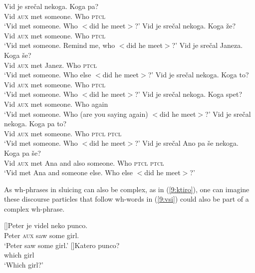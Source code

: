 \documentclass[output=paper,
modfonts,
newtxmath,
hidelinks
]{langscibook}
\begin{document}
\begin{exe}
\ex\label{9:vsi}
\begin{xlist}
 \ex 
 \gll Vid je srečal nekoga. Koga pa? \\
 Vid \textsc{aux} met someone. Who \textsc{ptcl} \\
 \trans `Vid met someone. Who $<$did he meet$>$?'
 \ex	
 \gll Vid je srečal nekoga. Koga že?\\
	 Vid \textsc{aux} met someone. Who \textsc{ptcl} \\
 \trans	`Vid met someone. Remind me, who $<$did he meet$>$?'
  \ex	
 \gll 	Vid je srečal Janeza. Koga še?\\
		Vid \textsc{aux} met Janez. Who \textsc{ptcl} \\
 \trans	`Vid met someone. Who else $<$did he meet$>$?'
 \ex	
 \gll 	Vid je srečal nekoga. Koga to?\\
		Vid \textsc{aux} met someone. Who \textsc{ptcl} \\
 \trans	`Vid met someone. Who $<$did he meet$>$?'
 \ex	
 \gll 	Vid je srečal nekoga. Koga spet?\\
		Vid \textsc{aux} met someone. Who again\\
 \trans	`Vid met someone. Who (are you saying again) $<$did he meet$>$?'
 \ex	
 \gll Vid je srečal nekoga. Koga pa to?\\
		Vid \textsc{aux} met someone. Who  \textsc{ptcl}  \textsc{ptcl}  \\
 \trans	`Vid met someone. Who $<$did he meet$>$?'
 \ex 
 \gll	Vid je srečal Ano pa še nekoga.  Koga pa še?\\
		Vid \textsc{aux} met Ana and also someone. Who \textsc{ptcl}  \textsc{ptcl} \\
 \trans	 `Vid met Ana and someone else. Who else $<$did he meet$>$?'
 \end{xlist}
\end{exe}

\noindent As wh-phrases in sluicing can also be complex, as in (\ref{9:ktiro}), one can imagine these discourse particles that follow wh-words in (\ref{9:vsi}) could also be part of a complex wh-phrase. 

\begin{exe}
 \ex\label{9:ktiro}
 \begin{xlist}
 []{\gll Peter je videl neko punco.\\
	Peter \textsc{aux} saw some girl.\\
    \trans `Peter saw some girl.'}
  []{\gll Katero punco?\\
  which girl\\
 \trans `Which girl?'}
 \end{xlist}
\end{exe}
\end{document}
